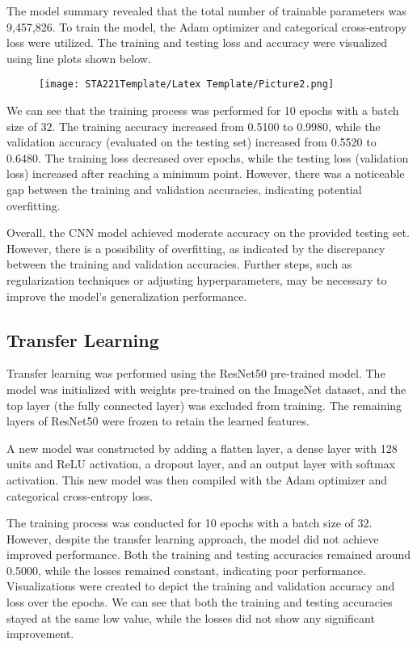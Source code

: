 \documentclass{article}
\begin{document}
The model summary revealed that the total number of trainable parameters was 9,457,826. To train the model, the Adam optimizer and categorical cross-entropy loss were utilized. The training and testing loss and accuracy were visualized using line plots shown below.

\begin{figure}[h]
\centering
    \texttt{[image: STA221Template/Latex Template/Picture2.png]}
\end{figure}

We can see that the training process was performed for 10 epochs with a batch size of 32. The training accuracy increased from 0.5100 to 0.9980, while the validation accuracy (evaluated on the testing set) increased from 0.5520 to 0.6480. The training loss decreased over epochs, while the testing loss (validation loss) increased after reaching a minimum point. However, there was a noticeable gap between the training and validation accuracies, indicating potential overfitting. 

Overall, the CNN model achieved moderate accuracy on the provided testing set. However, there is a possibility of overfitting, as indicated by the discrepancy between the training and validation accuracies. Further steps, such as regularization techniques or adjusting hyperparameters, may be necessary to improve the model's generalization performance.

\subsection{Transfer Learning}
Transfer learning was performed using the ResNet50 pre-trained model. The model was initialized with weights pre-trained on the ImageNet dataset, and the top layer (the fully connected layer) was excluded from training. The remaining layers of ResNet50 were frozen to retain the learned features.

A new model was constructed by adding a flatten layer, a dense layer with 128 units and ReLU activation, a dropout layer, and an output layer with softmax activation. This new model was then compiled with the Adam optimizer and categorical cross-entropy loss.

The training process was conducted for 10 epochs with a batch size of 32. However, despite the transfer learning approach, the model did not achieve improved performance. Both the training and testing accuracies remained around 0.5000, while the losses remained constant, indicating poor performance. Visualizations were created to depict the training and validation accuracy and loss over the epochs. We can see that both the training and testing accuracies stayed at the same low value, while the losses did not show any significant improvement.
\end{document}
